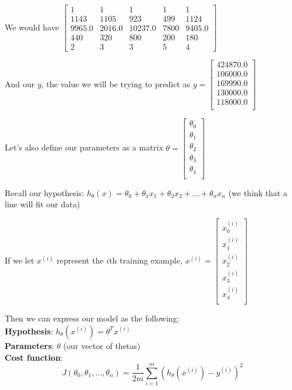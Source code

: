 \documentclass[11pt]{article}
\begin{document}
We would have 
 \(\begin{bmatrix}
 1 & 1 & 1 & 1 & 1 \\
1143 & 1105 & 923 & 499 & 1124 \\
9965.0 & 2016.0 & 10237.0 & 7800 & 9405.0 \\
440 & 320 & 800 & 200 & 180 \\
2 & 3 & 3 & 5 & 4 
 \end{bmatrix} \)
 
 And our $y$, the value we will be trying to predict as
\( y = \begin{bmatrix}
424870.0 \\
106000.0 \\
169990.0\\
130000.0\\
118000.0 \\
 \end{bmatrix}
\)

Let's also define our parameters as a matrix $\theta = 
\begin{bmatrix}
\theta_0 \\
\theta_1 \\
\theta_2 \\
\theta_3 \\
\theta_4\\
 \end{bmatrix}
 $

Recall our hypothesis: $h_\theta(x) = \theta_0 + \theta_1x_1+ \theta_2x_2 + ... +  \theta_nx_n$ (we think that a line will fit our data)

If we let  $x^{(i)}$ represent the $i$th training example, $x^{(i)} = $\(\begin{bmatrix}
x_0^{(i)} \\
x_1^{(i)} \\
x_2^{(i)} \\
x_3^{(i)} \\
x_4^{(i)} \\
 \end{bmatrix}\)
 
Then we can express our model as the following:\\

\textbf{Hypothesis}: $h_\theta(x^{(i)}) = \theta^Tx^{(i)}$\\

\textbf{Parameters}: $\theta$ (our vector of thetas)\\

\textbf{Cost function}: 
\[J(\theta_0, \theta_1,..., \theta_n) = \frac{1}{2m} \sum^m_{i=1}(h_\theta(x^{(i)}) - y^{(i)})^2\]\\
\end{document}
